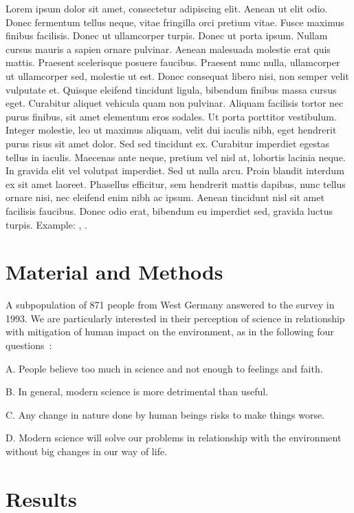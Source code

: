 \documentclass[Afour,times,sageh]{sagej}
\begin{document}
Lorem ipsum dolor sit amet, consectetur adipiscing elit. Aenean ut elit
odio. Donec fermentum tellus neque, vitae fringilla orci pretium vitae.
Fusce maximus finibus facilisis. Donec ut ullamcorper turpis. Donec ut
porta ipsum. Nullam cursus mauris a sapien ornare pulvinar. Aenean
malesuada molestie erat quis mattis. Praesent scelerisque posuere
faucibus. Praesent nunc nulla, ullamcorper ut ullamcorper sed, molestie
ut est. Donec consequat libero nisi, non semper velit vulputate et.
Quisque eleifend tincidunt ligula, bibendum finibus massa cursus eget.
Curabitur aliquet vehicula quam non pulvinar. Aliquam facilisis tortor
nec purus finibus, sit amet elementum eros sodales. Ut porta porttitor
vestibulum. Integer molestie, leo ut maximus aliquam, velit dui iaculis
nibh, eget hendrerit purus risus sit amet dolor. Sed sed tincidunt ex.
Curabitur imperdiet egestas tellus in iaculis. Maecenas ante neque,
pretium vel nisl at, lobortis lacinia neque. In gravida elit vel
volutpat imperdiet. Sed ut nulla arcu. Proin blandit interdum ex sit
amet laoreet. Phasellus efficitur, sem hendrerit mattis dapibus, nunc
tellus ornare nisi, nec eleifend enim nibh ac ipsum. Aenean tincidunt
nisl sit amet facilisis faucibus. Donec odio erat, bibendum eu imperdiet
sed, gravida luctus turpis. Example: \citep{Taylor1937},
\citep{Knupp1999, Kamm2000}.

\hypertarget{material-and-methods}{%
\section{Material and Methods}\label{material-and-methods}}

A subpopulation of 871 people from West Germany answered to the survey
in 1993. We are particularly interested in their perception of science
in relationship with mitigation of human impact on the environment, as
in the following four questions~:

A. People believe too much in science and not enough to feelings and
faith.

B. In general, modern science is more detrimental than useful.

C. Any change in nature done by human beings risks to make things worse.

D. Modern science will solve our problems in relationship with the
environment without big changes in our way of life.

\hypertarget{results}{%
\section{Results}\label{results}}
\end{document}
